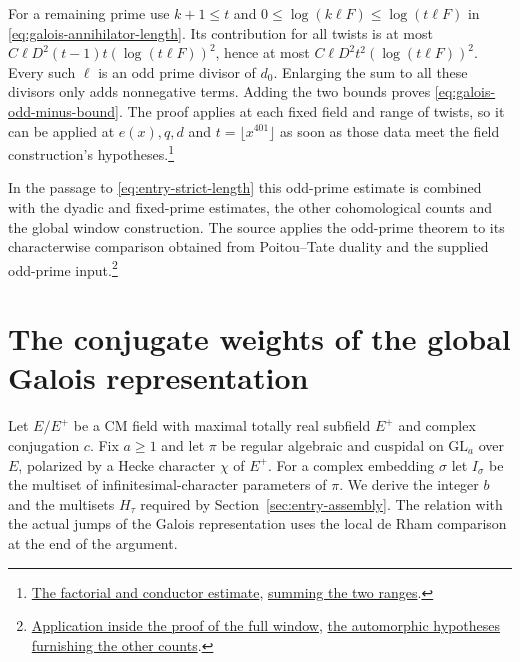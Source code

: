 For a remaining prime use \(k+1\le t\) and
\(0\le\log(k\ell F)\le\log(t\ell F)\) in
\eqref{eq:galois-annihilator-length}. Its contribution for all twists is
at most \(C\ell D^2(t-1)t(\log(t\ell F))^2\), hence at most
\(C\ell D^2t^2(\log(t\ell F))^2\). Every such \(\ell\) is an odd
prime divisor of \(d_0\). Enlarging the sum to all these divisors
only adds nonnegative terms. Adding the two bounds proves
\eqref{eq:galois-odd-minus-bound}. The proof applies at each fixed
field and range of twists, so it can be applied at \(e(x),q,d\) and
\(t=\lfloor x^{401}\rfloor\) as soon as those data meet the field
construction's hypotheses.\footnote{\href{https://github.com/Deicyde/riemann-hypothesis/blob/40e56bab/src/Development/AutomorphicArithmetic/AutomorphicVarieties/OddResidueBounds/ThmBcOfPsiBound.lean\#L110-L145}{The factorial and conductor estimate},
\href{https://github.com/Deicyde/riemann-hypothesis/blob/40e56bab/src/Development/AutomorphicArithmetic/AutomorphicVarieties/OddResidueBounds/ThmBcOfPsiBound.lean\#L178-L289}{summing the two ranges}.}

In the passage to \eqref{eq:entry-strict-length} this odd-prime
estimate is combined with the dyadic and fixed-prime estimates, the
other cohomological counts and the global window construction. The
source applies the odd-prime theorem to its characterwise comparison
obtained from Poitou--Tate duality and the supplied odd-prime
input.\footnote{\href{https://github.com/Deicyde/riemann-hypothesis/blob/40e56bab/src/Development/AutomorphicArithmetic/AutomorphicVarieties/ModularityArgument/ThresholdArguments/DenseThresholdCases/HVCore.lean\#L18-L22}{Application inside the proof of the full window},
\href{https://github.com/Deicyde/riemann-hypothesis/blob/40e56bab/src/Development/AutomorphicArithmetic/AutomorphicVarieties/ModularityArgument/ThresholdArguments/DenseThresholdCases/WindowBoundOfLiteratureLevel.lean\#L25-L34}{the automorphic hypotheses furnishing the other counts}.}

\section{The conjugate weights of the global Galois representation}
\label{sec:galois-parallel-weight}

Let \(E/E^+\) be a CM field with maximal totally real subfield \(E^+\)
and complex conjugation \(c\). Fix \(a\ge1\) and let \(\pi\) be regular
algebraic and cuspidal on \(\mathrm{GL}_a\) over \(E\), polarized by a
Hecke character \(\chi\) of \(E^+\). For a complex embedding \(\sigma\)
let \(I_\sigma\) be the multiset of infinitesimal-character parameters
of \(\pi\). We derive the integer \(b\) and the multisets \(H_\tau\)
required by Section~\ref{sec:entry-assembly}. The relation with the
actual jumps of the Galois representation uses the local de Rham
comparison at the end of the argument.

